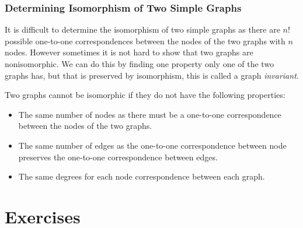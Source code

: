 \documentclass[12pt letter]{report}
\begin{document}
\subsection{Determining Isomorphism of Two Simple Graphs}

It is difficult to determine the isomorphism of two simple graphs as there are $n!$ possible one-to-one correspondences
between the nodes of the two graphs with $n$ nodes. However sometimes  it is not hard to show that two graphs are
nonisomorphic. We can do this by finding one property only one of the two graphs has, but that is preserved by
isomorphism, this is called a graph \textit{invariant}.


Two graphs cannot be isomorphic if they do not have the following properties:
\begin{itemize}
  \item The same number of nodes as there must be a one-to-one correspondence between the nodes of the two graphs.
  \item The same number of edges as the one-to-one correspondence between node preserves the one-to-one correspondence
        between edges.
  \item The same degrees for each node correspondence between each graph.
\end{itemize}

\chapter{Exercises}

\end{document}
